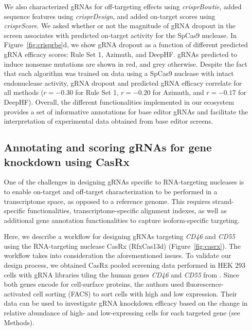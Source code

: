 \documentclass[pdftex,english,10pt]{article}
\begin{document}
We also characterized gRNAs for off-targeting effects using \textit{crisprBowtie}, added sequence features using \textit{crisprDesign}, and added on-target scores using \textit{crisprScore}. We asked whether or not the magnitude of gRNA dropout in the screen associates with predicted on-target activity for the SpCas9 nuclease. In Figure~\ref{fig:crisprbe}d, we show gRNA dropout as a function of different predicted gRNA efficacy scores: Rule Set 1, Azimuth, and DeepHF.  gRNAs predicted to induce nonsense mutations are shown in red, and grey otherwise. Despite the fact that each algorithm was trained on data using a SpCas9 nuclease with intact endonuclease activity, gRNA dropout and predicted gRNA efficacy correlate for all methods ($r = -0.30$ for Rule Set 1, $r =  -0.20$ for Azimuth, and $r = -0.17$ for DeepHF). Overall, the different functionalities implemented in our ecosystem provides a set of informative annotations for base editor gRNAs and facilitate the interpretation of experimental data obtained from base editor screens.




\subsection*{Annotating and scoring gRNAs for gene knockdown using CasRx}

One of the challenges in designing gRNAs specific to RNA-targeting nucleases is to enable on-target and off-target characterization to be performed in a transcriptome space, as opposed to a reference genome. This requires strand-specific functionalities, transcriptome-specific alignment indexes, as well as additional gene annotation functionalities to capture isoform-specific targeting.  

Here, we describe a workflow for designing gRNAs targeting \textit{CD46} and \textit{CD55} using the RNA-targeting nuclease CasRx (RfxCas13d) \citep{cas13d} (Figure~\ref{fig:casrx}).
The workflow takes into consideration the aforementioned issues. To validate our design process, we obtained CasRx pooled screening data performed in HEK 293 cells with gRNA libraries tiling the human genes \textit{CD46} and \textit{CD55} from \citet{wessels2020massively}. Since both genes encode for cell-surface proteins, the authors used fluorescence-activated cell sorting (FACS) to sort cells with high and low expression. Their data can be used to investigate gRNA knockdown efficacy based on the change in relative abundance of high- and low-expressing cells for each targeted gene (see Methods). 
\end{document}
